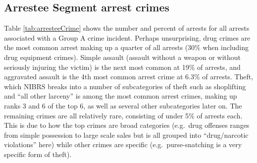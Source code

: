 \documentclass[
  12pt,
  openany]{book}
\begin{document}
\subsection{Arrestee Segment arrest crimes}\label{arrestee-segment-arrest-crimes}

Table \ref{tab:arresteeCrime} shows the number and percent of arrests for all arrests associated with a Group A crime incident. Perhaps unsurprising, drug crimes are the most common arrest making up a quarter of all arrests (30\% when including drug equipment crimes). Simple assault (assault without a weapon or without seriously injuring the victim) is the next most common at 19\% of arrests, and aggravated assault is the 4th most common arrest crime at 6.3\% of arrests. Theft, which NIBRS breaks into a number of subcategories of theft such as shoplifting and ``all other larceny'' is among the most common arrest crimes, making up ranks 3 and 6 of the top 6, as well as several other subcategories later on. The remaining crimes are all relatively rare, consisting of under 5\% of arrests each. This is due to how the top crimes are broad categories (e.g.~drug offenses ranges from simple possession to large scale sales but is all grouped into ``drug/narcotic violations'' here) while other crimes are specific (e.g.~purse-snatching is a very specific form of theft).
\end{document}
